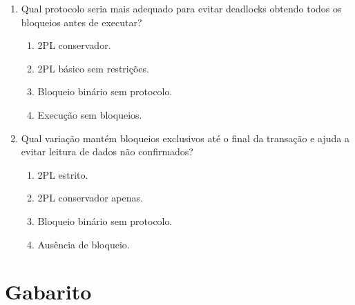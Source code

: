 \documentclass[12pt,a4paper]{article}
\begin{document}
\begin{enumerate}[resume,label=\textbf{Q\arabic*.}]
\item Qual protocolo seria mais adequado para evitar deadlocks obtendo todos os bloqueios antes de executar?

\begin{enumerate}[label=\alph*)]
    \item 2PL conservador.
    \item 2PL básico sem restrições.
    \item Bloqueio binário sem protocolo.
    \item Execução sem bloqueios.
\end{enumerate}

\item Qual variação mantém bloqueios exclusivos até o final da transação e ajuda a evitar leitura de dados não confirmados?

\begin{enumerate}[label=\alph*)]
    \item 2PL estrito.
    \item 2PL conservador apenas.
    \item Bloqueio binário sem protocolo.
    \item Ausência de bloqueio.
\end{enumerate}

\end{enumerate}

\newpage

\section*{Gabarito}
\end{document}
